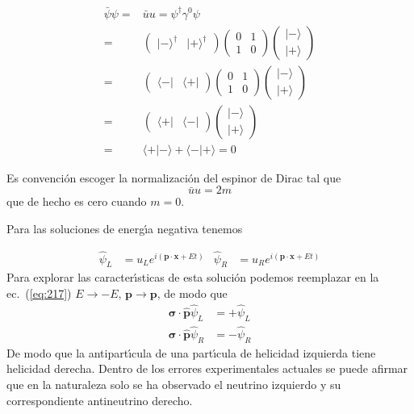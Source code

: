 \begin{align}
  \bar{\psi}\psi=&\bar{u}{u}=\psi^\dagger \gamma^0 \psi\nonumber\\
  =&\begin{pmatrix}
    |-\rangle^\dagger & |+\rangle^\dagger
  \end{pmatrix}
  \begin{pmatrix}
    0&1\\
    1&0    
  \end{pmatrix}
  \begin{pmatrix}
    |-\rangle\\
    |+\rangle
  \end{pmatrix}\nonumber\\
  =&\begin{pmatrix}
    \langle-| & \langle+|
  \end{pmatrix}
  \begin{pmatrix}
    0&1\\
    1&0    
  \end{pmatrix}
  \begin{pmatrix}
    |-\rangle\\
    |+\rangle
  \end{pmatrix}\nonumber\\
  =&\begin{pmatrix}
    \langle+| & \langle-| 
  \end{pmatrix}
  \begin{pmatrix}
    |-\rangle\\
    |+\rangle
  \end{pmatrix}\nonumber\\
  =&\langle+|-\rangle+\langle-|+\rangle=0
\end{align}

Es convenci\'on escoger la normalizaci\'on del espinor de Dirac tal que
\begin{equation}
  \bar{u}{u}=2m
\end{equation}
que de hecho es cero cuando $m=0$.

Para las soluciones de energ\'\i a negativa tenemos

\begin{align}
    \hat{\psi}_L&=u_L e^{i(\mathbf{p}\cdot \mathbf{x}+E t)} & \hat{\psi}_R&=u_R e^{i(\mathbf{p}\cdot \mathbf{x}+E t)}
\end{align}
Para explorar las caracter\'\i sticas de esta soluci\'on podemos reemplazar en la ec.~(\ref{eq:217}) $E\to-E$, $\mathbf{p}\to\mathbf{p}$, de modo que
\begin{align}
  \boldsymbol{\sigma}\cdot\hat{\mathbf{p}}\hat{\psi}_L &=+\hat{\psi}_L\nonumber\\
  \boldsymbol{\sigma}\cdot\hat{\mathbf{p}}\hat{\psi}_R&=-\hat{\psi}_R
\end{align}
De modo que la antipart\'\i cula de una part\'\i cula de helicidad izquierda tiene helicidad derecha. Dentro de los errores experimentales actuales se puede afirmar que en la naturaleza solo se ha observado el neutrino izquierdo y su correspondiente antineutrino derecho.

